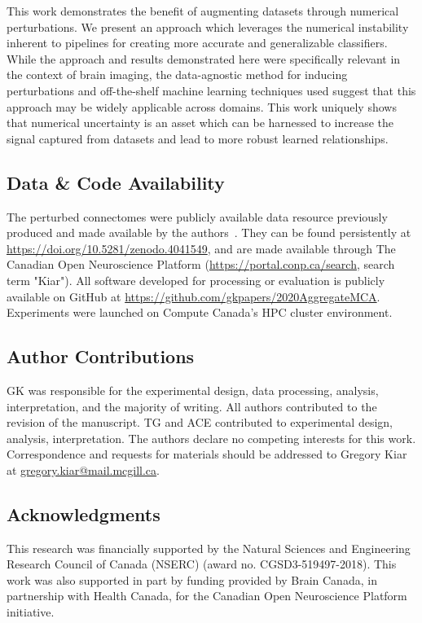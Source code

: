 \documentclass[10pt]{SelfArx} %
\begin{document}
This work demonstrates the benefit of augmenting datasets through numerical perturbations. We present an approach which
leverages the numerical instability inherent to pipelines for creating more accurate and generalizable classifiers.
While the approach and results demonstrated here were specifically relevant in the context of brain imaging, the
data-agnostic method for inducing perturbations and off-the-shelf machine learning techniques used suggest that this
approach may be widely applicable across domains. This work uniquely shows that numerical uncertainty is an asset which
can be harnessed to increase the signal captured from datasets and lead to more robust learned relationships.


\subsection*{Data \& Code Availability}
The perturbed connectomes were publicly available data resource previously produced and made available by the
authors~\cite{Kiar2020-yz}. They can be found persistently at \url{https://doi.org/10.5281/zenodo.4041549}, and are
made available through The Canadian Open Neuroscience Platform (\url{https://portal.conp.ca/search}, search term
"Kiar"). All software developed for processing or evaluation is publicly available on GitHub at
\url{https://github.com/gkpapers/2020AggregateMCA}. Experiments were launched on Compute Canada's HPC cluster
environment. 

\subsection*{Author Contributions}
GK was responsible for the experimental design, data processing, analysis, interpretation, and the majority of writing.
All authors contributed to the revision of the manuscript. TG and ACE contributed to experimental design, analysis,
interpretation. The authors declare no competing interests for this work. Correspondence and requests for materials
should be addressed to Gregory Kiar at \url{gregory.kiar@mail.mcgill.ca}.

\subsection*{Acknowledgments} 
This research was financially supported by the Natural Sciences and Engineering Research Council of Canada (NSERC)
(award no. CGSD3-519497-2018). This work was also supported in part by funding provided by Brain Canada, in partnership
with Health Canada, for the Canadian Open Neuroscience Platform initiative.



\end{document}
